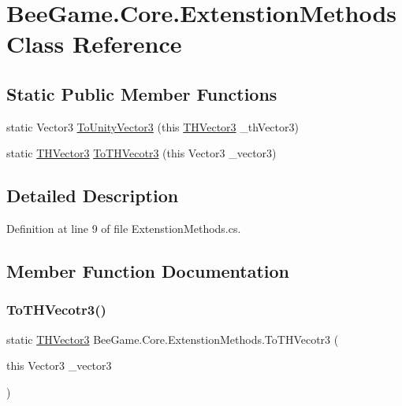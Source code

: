 \hypertarget{class_bee_game_1_1_core_1_1_extenstion_methods}{}\section{Bee\+Game.\+Core.\+Extenstion\+Methods Class Reference}
\label{class_bee_game_1_1_core_1_1_extenstion_methods}
\subsection*{Static Public Member Functions}
\begin{DoxyCompactItemize}
\item 
static Vector3 \hyperlink{class_bee_game_1_1_core_1_1_extenstion_methods_a95fbadd32275cb0c5fc065655f91bec8}{To\+Unity\+Vector3} (this \hyperlink{struct_bee_game_1_1_t_h_vector3}{T\+H\+Vector3} \+\_\+th\+Vector3)
\item 
static \hyperlink{struct_bee_game_1_1_t_h_vector3}{T\+H\+Vector3} \hyperlink{class_bee_game_1_1_core_1_1_extenstion_methods_a18389aa1c5683971b53d71029ae14a72}{To\+T\+H\+Vecotr3} (this Vector3 \+\_\+vector3)
\end{DoxyCompactItemize}


\subsection{Detailed Description}


Definition at line 9 of file Extenstion\+Methods.\+cs.



\subsection{Member Function Documentation}
\mbox{\label{class_bee_game_1_1_core_1_1_extenstion_methods_a18389aa1c5683971b53d71029ae14a72}} 
\subsubsection{\texorpdfstring{To\+T\+H\+Vecotr3()}{ToTHVecotr3()}}
{\footnotesize\ttfamily static \hyperlink{struct_bee_game_1_1_t_h_vector3}{T\+H\+Vector3} Bee\+Game.\+Core.\+Extenstion\+Methods.\+To\+T\+H\+Vecotr3 (\begin{DoxyParamCaption}\item[{this Vector3}]{\+\_\+vector3 }\end{DoxyParamCaption})\hspace{0.3cm}{\ttfamily [static]}}



